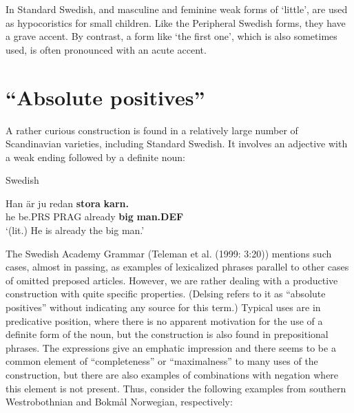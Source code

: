 In Standard Swedish,  and  masculine and feminine weak forms of  ‘little’, are used as hypocoristics for small children. Like the Peripheral Swedish forms, they have a grave accent. By contrast, a form like  ‘the first one’, which is also sometimes used, is often pronounced with an acute accent. 


\section{\rmfamily “Absolute positives”}
\label{bkm:Ref141250984}
A rather curious construction is found in a relatively large number of Scandinavian varieties, including Standard Swedish. It involves an adjective with a weak ending followed by a definite noun:


\item 

Swedish



 \ea\label{}
\gll Han  är  ju  redan  \textbf{stora}\textbf{  karn.}\\


he  be.PRS  PRAG  already  \textbf{big} \textbf{man.DEF}\\

\glt ‘(lit.) He is already the big man.’

\z

The Swedish Academy Grammar (Teleman et al. (1999: 3:20)) mentions such cases, almost in passing, as examples of lexicalized phrases parallel to other cases of omitted preposed articles. However, we are rather dealing with a productive construction with quite specific properties. (Delsing refers to it as “absolute positives” without indicating any source for this term.) Typical uses are in predicative position, where there is no apparent motivation for the use of a definite form of the noun, but the construction is also found in prepositional phrases. The expressions give an emphatic impression and there seems to be a common element of “completeness” or “maximalness” to many uses of the construction, but there are also examples of combinations with negation where this element is not present. Thus, consider the following examples from southern Westrobothnian and Bokmål Norwegian, respectively: 

